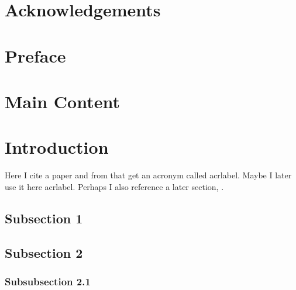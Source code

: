 \documentclass[12pt]{article}
\begin{document}
\listoftables
{}
\vspace{2em}
\newpage

\section*{Acknowledgements}\label{Acknowledgements}
\vspace{2em}

\section*{Preface}\label{Preface}
\vspace{2em}
\blindtext


\newpage
{}
\section*{Main Content}%


\section{Introduction} \label{Sec: Introduction}
Here I cite a paper \cite{Example_Reference} and from that get an acronym called \acrfull{acrlabel}. Maybe I later use it here \ac{acrlabel}. Perhaps I also reference a later section, \secref{\ref{Sec: A Title with Maths}}.


\subsection{Subsection 1}
\blindtext

\subsection{Subsection 2}
\blindtext

\subsubsection{Subsubsection 2.1}
\end{document}
